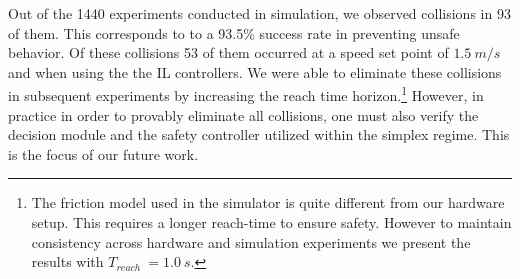 \documentclass[manuscript,screen,review]{acmart}
\begin{document}



Out of the 1440 experiments conducted in simulation, we observed collisions in 93 of them. This corresponds to to a 93.5\% success rate in preventing unsafe behavior. Of these collisions 53 of them occurred at a speed set point of $1.5 \ m/s$ and when using the the IL controllers. We were able to eliminate these collisions in subsequent experiments by increasing the reach time horizon.\footnote{The friction model used in the simulator is quite different from our hardware setup. This requires a longer reach-time to ensure safety. However to maintain consistency across hardware and simulation experiments we present the results with $T_{reach} \ = 1.0 \ s.$} However, in practice in order to provably eliminate all collisions, one must also verify the decision module and the safety controller utilized within the simplex regime. This is the focus of our future work.
\end{document}
